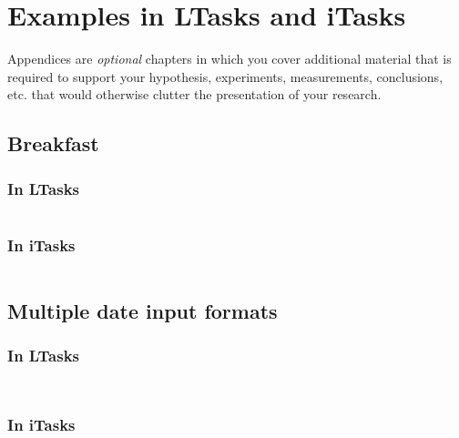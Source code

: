\chapter{Examples in LTasks and iTasks}\label{appendix}
Appendices are \emph{optional} chapters in which you cover additional material that is required to support your
hypothesis, experiments, measurements, conclusions, etc. that would otherwise
clutter the presentation of your research.

\section{Breakfast}\label{appendix-breakfast}
\subsection{In LTasks}
\inputminted{lua}{examples/breakfast.lua}

\subsection{In iTasks}
\inputminted{clean}{examples/breakfast.icl}

\section{Multiple date input formats}\label{appendix-dates}
\subsection{In LTasks}

\inputminted{lua}{examples/date_1.lua}

\inputminted{lua}{examples/date_2.lua}

\subsection{In iTasks}

